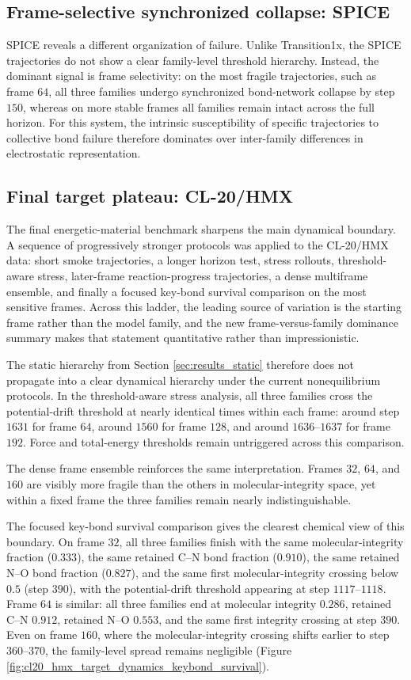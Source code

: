 \subsection{Frame-selective synchronized collapse: SPICE}
SPICE reveals a different organization of failure. Unlike Transition1x, the SPICE trajectories do not show a clear family-level threshold hierarchy. Instead, the dominant signal is frame selectivity: on the most fragile trajectories, such as frame $64$, all three families undergo synchronized bond-network collapse by step $150$, whereas on more stable frames all families remain intact across the full horizon. For this system, the intrinsic susceptibility of specific trajectories to collective bond failure therefore dominates over inter-family differences in electrostatic representation.

\subsection{Final target plateau: CL-20/HMX}
The final energetic-material benchmark sharpens the main dynamical boundary. A sequence of progressively stronger protocols was applied to the CL-20/HMX data: short smoke trajectories, a longer horizon test, stress rollouts, threshold-aware stress, later-frame reaction-progress trajectories, a dense multiframe ensemble, and finally a focused key-bond survival comparison on the most sensitive frames. Across this ladder, the leading source of variation is the starting frame rather than the model family, and the new frame-versus-family dominance summary makes that statement quantitative rather than impressionistic.

The static hierarchy from Section \ref{sec:results_static} therefore does not propagate into a clear dynamical hierarchy under the current nonequilibrium protocols. In the threshold-aware stress analysis, all three families cross the potential-drift threshold at nearly identical times within each frame: around step $1631$ for frame $64$, around $1560$ for frame $128$, and around $1636$--$1637$ for frame $192$. Force and total-energy thresholds remain untriggered across this comparison.

The dense frame ensemble reinforces the same interpretation. Frames $32$, $64$, and $160$ are visibly more fragile than the others in molecular-integrity space, yet within a fixed frame the three families remain nearly indistinguishable.

The focused key-bond survival comparison gives the clearest chemical view of this boundary. On frame $32$, all three families finish with the same molecular-integrity fraction ($0.333$), the same retained C--N bond fraction ($0.910$), the same retained N--O bond fraction ($0.827$), and the same first molecular-integrity crossing below $0.5$ (step $390$), with the potential-drift threshold appearing at step $1117$--$1118$. Frame $64$ is similar: all three families end at molecular integrity $0.286$, retained C--N $0.912$, retained N--O $0.553$, and the same first integrity crossing at step $390$. Even on frame $160$, where the molecular-integrity crossing shifts earlier to step $360$--$370$, the family-level spread remains negligible (Figure \ref{fig:cl20_hmx_target_dynamics_keybond_survival}).

